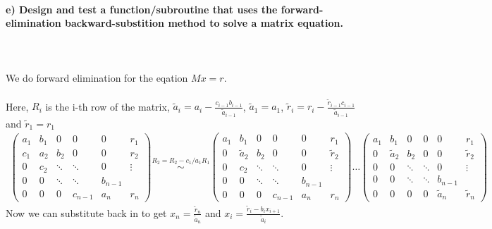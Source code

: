 \newpage
\paragraph{
    e) Design and test a function/subroutine that uses the
    forward-elimination backward-substition method to solve a matrix
    equation.
} \ \\
    \\
    We do forward elimination for the eqation $Mx = r$. \\
    \\
    Here, $R_i$ is the i-th row of the matrix, 
    $\tilde{a}_i = a_i - \frac{c_{i-1} b_{i-1}}{\tilde{a}_{i-1}}$, 
    $\tilde{a}_1 = a_1$, 
    $\tilde{r}_i = r_i - \frac{\tilde{r}_{i-1} c_{i-1}}{\tilde{a}_{i-1}}$ and 
    $\tilde{r}_1 = r_1$ \\
    \begin{align}
	\begin{pmatrix}
	a_1 & b_1 & 0      & 0       & 0   & r_1\\
	c_1 & a_2 & b_2    & 0       & 0 & r_2\\
	0   & c_2 & \ddots & \ddots  & 0 & \vdots\\
	0   & 0   & \ddots & \ddots  & b_{n-1} &\\
	0   & 0   & 0      & c_{n-1} & a_n& r_n
	\end{pmatrix}
	\overset{R_2 = R_2 - c_1/a_1 R_1}{\sim}
	\begin{pmatrix}
	a_1 & b_1 & 0      & 0       & 0   & r_1\\
	0 & \tilde{a}_2 & b_2    & 0       & 0 & \tilde{r}_2\\
	0   & c_2 & \ddots & \ddots  & 0 & \vdots\\
	0   & 0   & \ddots & \ddots  & b_{n-1} &\\
	0   & 0   & 0      & c_{n-1} & a_n& r_n
	\end{pmatrix}
	\dots
	\begin{pmatrix}
	a_1 & b_1 & 0      & 0       & 0   & r_1\\
	0 & \tilde{a}_2 & b_2    & 0       & 0 & \tilde{r}_2\\
	0   & 0 & \ddots & \ddots  & 0 & \vdots\\
	0   & 0   & \ddots & \ddots  & b_{n-1} &\\
	0   & 0   & 0      & 0 & \tilde{a}_n& \tilde{r}_n
	\end{pmatrix}
    \end{align}
    Now we can substitute back in to get
    $x_n = \frac{\tilde{r}_n}{\tilde{a}_n} $ and
    $x_i = \frac{\tilde{r}_{i} - b_{i} x_{i+1}}{\tilde{a}_{i}}$.

